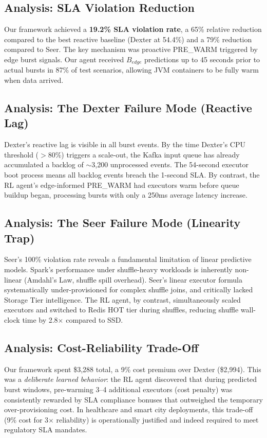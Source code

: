 \documentclass[10pt, conference, compsocconf]{IEEEtran}
\begin{document}
\subsection{Analysis: SLA Violation Reduction}

Our framework achieved a \textbf{19.2\% SLA violation rate}, a 65\% relative reduction compared to the best reactive baseline (Dexter at 54.4\%) and a 79\% reduction compared to Seer. The key mechanism was proactive PRE\_WARM triggered by edge burst signals. Our agent received $B_{edge}$ predictions up to 45 seconds prior to actual bursts in 87\% of test scenarios, allowing JVM containers to be fully warm when data arrived.

\subsection{Analysis: The Dexter Failure Mode (Reactive Lag)}

Dexter's reactive lag is visible in all burst events. By the time Dexter's CPU threshold ($>$80\%) triggers a scale-out, the Kafka input queue has already accumulated a backlog of $\sim$3,200 unprocessed events. The 54-second executor boot process means all backlog events breach the 1-second SLA. By contrast, the RL agent's edge-informed PRE\_WARM had executors warm before queue buildup began, processing bursts with only a 250ms average latency increase.

\subsection{Analysis: The Seer Failure Mode (Linearity Trap)}

Seer's 100\% violation rate reveals a fundamental limitation of linear predictive models. Spark's performance under shuffle-heavy workloads is inherently non-linear (Amdahl's Law, shuffle spill overhead). Seer's linear executor formula systematically under-provisioned for complex shuffle joins, and critically lacked Storage Tier intelligence. The RL agent, by contrast, simultaneously scaled executors and switched to Redis HOT tier during shuffles, reducing shuffle wall-clock time by 2.8$\times$ compared to SSD.

\subsection{Analysis: Cost-Reliability Trade-Off}

Our framework spent \$3,288 total, a 9\% cost premium over Dexter (\$2,994). This was a \textit{deliberate learned behavior}: the RL agent discovered that during predicted burst windows, pre-warming 3--4 additional executors (cost penalty) was consistently rewarded by SLA compliance bonuses that outweighed the temporary over-provisioning cost. In healthcare and smart city deployments, this trade-off (9\% cost for 3$\times$ reliability) is operationally justified and indeed required to meet regulatory SLA mandates.
\end{document}
